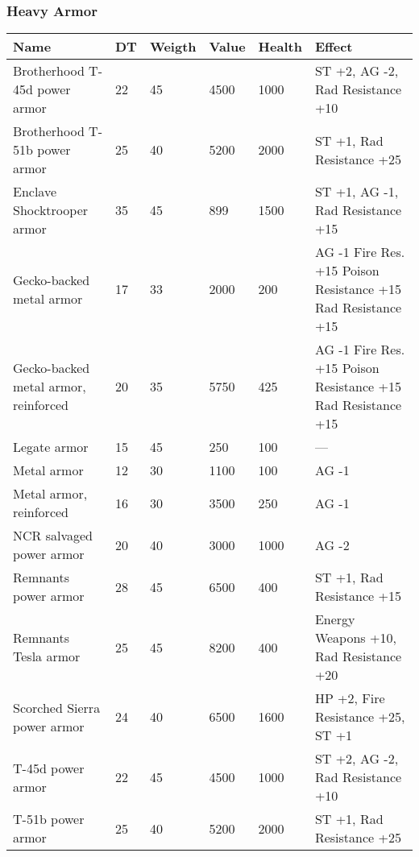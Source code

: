 
\subsubsection{Heavy Armor}
\begin{longtable}{|p{4cm}|p{1.2cm}|p{1.2cm}|p{1.2cm}|p{1.2cm}|p{6cm}|}
\hline
\bfseries Name & \bfseries DT & \bfseries Weigth & \bfseries Value & \bfseries Health & \bfseries Effect \\
\hline
\endhead
Brotherhood T-45d power armor & 22 & 45 & 4500 & 1000 & ST +2, AG -2, Rad Resistance +10 \\
Brotherhood T-51b power armor & 25 & 40 & 5200 & 2000 & ST +1, Rad Resistance +25 \\
Enclave Shocktrooper armor & 35 & 45 & 899 & 1500 & ST +1, AG -1, Rad Resistance +15 \\
Gecko-backed metal armor & 17 & 33 & 2000 & 200 & AG -1 Fire Res. +15 Poison Resistance +15 Rad Resistance +15 \\
Gecko-backed metal armor, reinforced & 20 & 35 & 5750 & 425 & AG -1 Fire Res. +15 Poison Resistance +15 Rad Resistance +15 \\
Legate armor & 15 & 45 & 250 & 100 & — \\
Metal armor & 12 & 30 & 1100 & 100 & AG -1 \\
Metal armor, reinforced & 16 & 30 & 3500 & 250 & AG -1 \\
NCR salvaged power armor & 20 & 40 & 3000 & 1000 & AG -2 \\
Remnants power armor & 28 & 45 & 6500 & 400 & ST +1, Rad Resistance +15 \\
Remnants Tesla armor & 25 & 45 & 8200 & 400 & Energy Weapons +10, Rad Resistance +20 \\
Scorched Sierra power armor & 24 & 40 & 6500 & 1600 & HP +2, Fire Resistance +25, ST +1 \\
T-45d power armor & 22 & 45 & 4500 & 1000 & ST +2, AG -2, Rad Resistance +10 \\
T-51b power armor & 25 & 40 & 5200 & 2000 & ST +1, Rad Resistance +25 \\
\hline
\end{longtable}

